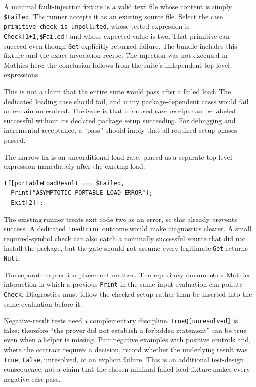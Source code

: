 \documentclass[11pt,letterpaper]{article}
\newcommand{\code}[1]{\texttt{#1}}
\begin{document}
A minimal fault-injection fixture is a valid text file whose content is simply \code{\$Failed}. The runner accepts it as an existing source file. Select the case \nolinkurl{primitive-check-is-unpolluted}, whose tested expression is \code{Check[1+1,\$Failed]} and whose expected value is two. That primitive can succeed even though \code{Get} explicitly returned failure. The bundle includes this fixture and the exact invocation recipe. The injection was not executed in Mathics here; the conclusion follows from the suite's independent top-level expressions.

This is not a claim that the entire suite would pass after a failed load. The dedicated loading case should fail, and many package-dependent cases would fail or remain unresolved. The issue is that a focused case receipt can be labeled successful without its declared package setup succeeding. For debugging and incremental acceptance, a ``pass'' should imply that all required setup phases passed.

The narrow fix is an unconditional load gate, placed as a separate top-level expression immediately after the existing load:
\begin{lstlisting}
If[portableLoadResult === $Failed,
  Print["ASYMPTOTIC_PORTABLE_LOAD_ERROR"];
  Exit[2]];
\end{lstlisting}
The existing runner treats exit code two as an error, so this already prevents success. A dedicated \code{LoadError} outcome would make diagnostics clearer. A small required-symbol check can also catch a nominally successful source that did not install the package, but the gate should not assume every legitimate \code{Get} returns \code{Null}.

The separate-expression placement matters. The repository documents a Mathics interaction in which a previous \code{Print} in the same input evaluation can pollute \code{Check}. Diagnostics must follow the checked setup rather than be inserted into the same evaluation before it.~\cite{compat,portable}

Negative-result tests need a complementary discipline. \code{TrueQ[unresolved]} is false; therefore ``the prover did not establish a forbidden statement'' can be true even when a helper is missing. Pair negative examples with positive controls and, where the contract requires a decision, record whether the underlying result was \code{True}, \code{False}, unresolved, or an explicit failure. This is an additional test-design consequence, not a claim that the chosen minimal failed-load fixture makes every negative case pass.
\end{document}
